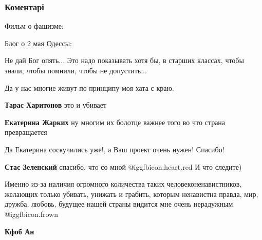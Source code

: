  
 
 
 
 
\subsubsection{Коментарі}
\label{sec:25_11_2021.fb.zharkih_katerina.1.nasilie_v_ukraine.cmt}

\begin{itemize} %

Фильм о фашизме:

\zzrule

Блог о 2 мая Одессы: 

\zzrule

\begin{itemize} %
Не дай Бог опять... Это надо показывать хотя бы, в старших классах, чтобы знали, чтобы помнили, чтобы не допустить...
\end{itemize} %

Да у нас многие живут по принципу моя хата с краю.

\textbf{Тарас Харитонов} это и убивает

\textbf{Екатерина Жарких} ну многим их болотце важнее того во что страна превращается


Да Екатерина соскучились уже!, а Ваш проект очень нужен! Спасибо!

\textbf{Стас Зеленский} спасибо, что со мной @igg{fbicon.heart.red}
И что следите)


Именно из-за наличия огромного количества таких человеконенавистников, желающих
только убивать, унижать и грабить, которым ненавистна правда, мир, дружба,
любовь, будущее нашей страны видится мне очень нерадужным  @igg{fbicon.frown} 

\begin{itemize} %
\textbf{Кфоб Ан} 


\end{itemize}
\end{itemize}
